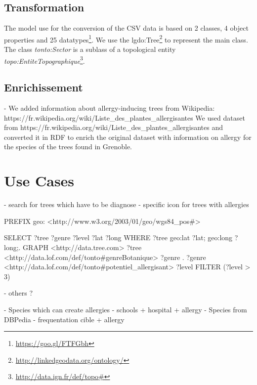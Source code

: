 \documentclass[a4paper,pagenum,english]{rnti}
\begin{document}
{\subsection{Transformation}
The model use for the conversion of the CSV data is based on 2 classes, 4 object properties and 25 datatypes\footnote{\url{https://goo.gl/FTFGbh}}.  
We use the lgdo:Tree\footnote{\url{http://linkedgeodata.org/ontology/}} to represent the main class. The class \textit{tonto:Sector} is a sublass of a topological entity \textit{topo:EntiteTopographique}\footnote{\url{http://data.ign.fr/def/topo#}}. 


\subsection{Enrichissement}
	- We added information about allergy-inducing trees from Wikipedia: https://fr.wikipedia.org/wiki/Liste_des_plantes_allergisantes
We used dataset from https://fr.wikipedia.org/wiki/Liste_des_plantes_allergisantes and converted it in RDF to enrich the original dataset with information on allergy for the species of the trees found in Grenoble. 

\section{Use Cases}
- search for trees which have to be diagnose
- specific icon for trees with allergies

PREFIX geo: <http://www.w3.org/2003/01/geo/wgs84_pos#>

SELECT ?tree ?genre ?level ?lat ?long
WHERE {
  ?tree geo:lat ?lat;
        geo:long ?long;.
  GRAPH <http://data.tree.com> {
    ?tree <http://data.lof.com/def/tonto#genreBotanique> ?genre .
    ?genre <http://data.lof.com/def/tonto#potentiel_allergisant> ?level }
  FILTER (?level > 3)
}

- others ?

- Species which can create allergies
- schools + hospital + allergy
- Species from DBPedia
- frequentation cible + allergy

}
\end{document}

